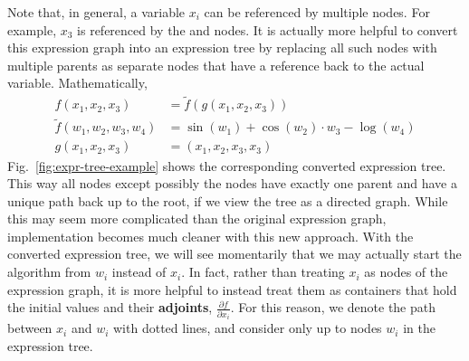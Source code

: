 Note that, in general, a variable $x_i$ can be referenced by multiple nodes.
For example, $x_3$ is referenced by the \code{*} and  nodes.
It is actually more helpful to convert this expression graph into an expression tree
by replacing all such nodes with multiple parents as separate nodes
that have a reference back to the actual variable.
Mathematically,
\begin{align}
    f(x_1, x_2, x_3) &= \tilde{f}(g(x_1, x_2, x_3)) \label{eq:f-tree-example} \\
    \tilde{f}(w_1, w_2, w_3, w_4) &= \sin(w_1) + \cos(w_2) \cdot w_3 - \log(w_4) \nonumber \\
    g(x_1, x_2, x_3) &= (x_1, x_2, x_3, x_3) \nonumber
\end{align}
Fig.~\ref{fig:expr-tree-example} shows the corresponding converted expression tree.
This way all nodes except possibly the  nodes have exactly one parent
and have a unique path back up to the root, if we view the tree as a directed graph.
While this may seem more complicated than the original expression graph,
implementation becomes much cleaner with this new approach.
With the converted expression tree, we will see momentarily that 
we may actually start the algorithm from $w_i$ instead of $x_i$.
In fact, rather than treating $x_i$ as nodes of the expression graph,
it is more helpful to instead treat them as containers 
that hold the initial values and their \textbf{adjoints}, $\frac{\partial f}{\partial x_i}$.
For this reason, we denote the path between $x_i$ and $w_i$ with dotted lines,
and consider only up to nodes $w_i$ in the expression tree.

